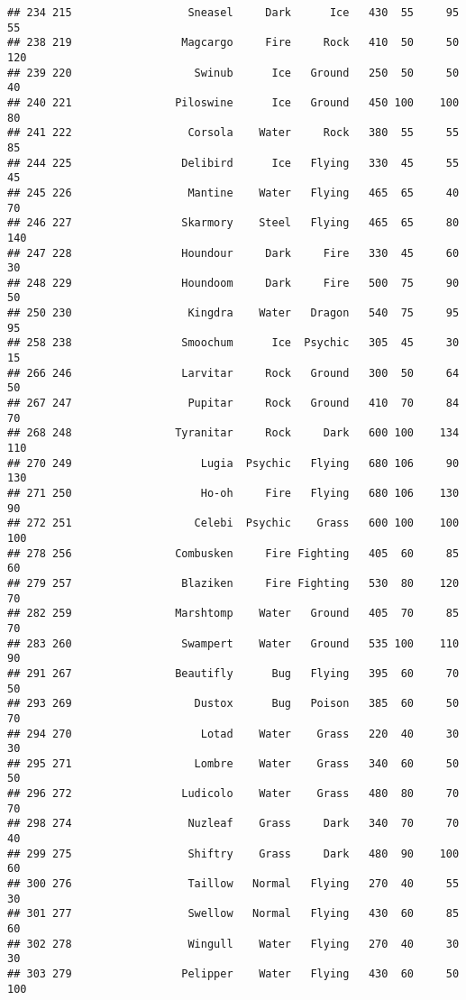 \documentclass[
]{article}
\begin{document}
\begin{verbatim}
## 234 215                  Sneasel     Dark      Ice   430  55     95      55
## 238 219                 Magcargo     Fire     Rock   410  50     50     120
## 239 220                   Swinub      Ice   Ground   250  50     50      40
## 240 221                Piloswine      Ice   Ground   450 100    100      80
## 241 222                  Corsola    Water     Rock   380  55     55      85
## 244 225                 Delibird      Ice   Flying   330  45     55      45
## 245 226                  Mantine    Water   Flying   465  65     40      70
## 246 227                 Skarmory    Steel   Flying   465  65     80     140
## 247 228                 Houndour     Dark     Fire   330  45     60      30
## 248 229                 Houndoom     Dark     Fire   500  75     90      50
## 250 230                  Kingdra    Water   Dragon   540  75     95      95
## 258 238                 Smoochum      Ice  Psychic   305  45     30      15
## 266 246                 Larvitar     Rock   Ground   300  50     64      50
## 267 247                  Pupitar     Rock   Ground   410  70     84      70
## 268 248                Tyranitar     Rock     Dark   600 100    134     110
## 270 249                    Lugia  Psychic   Flying   680 106     90     130
## 271 250                    Ho-oh     Fire   Flying   680 106    130      90
## 272 251                   Celebi  Psychic    Grass   600 100    100     100
## 278 256                Combusken     Fire Fighting   405  60     85      60
## 279 257                 Blaziken     Fire Fighting   530  80    120      70
## 282 259                Marshtomp    Water   Ground   405  70     85      70
## 283 260                 Swampert    Water   Ground   535 100    110      90
## 291 267                Beautifly      Bug   Flying   395  60     70      50
## 293 269                   Dustox      Bug   Poison   385  60     50      70
## 294 270                    Lotad    Water    Grass   220  40     30      30
## 295 271                   Lombre    Water    Grass   340  60     50      50
## 296 272                 Ludicolo    Water    Grass   480  80     70      70
## 298 274                  Nuzleaf    Grass     Dark   340  70     70      40
## 299 275                  Shiftry    Grass     Dark   480  90    100      60
## 300 276                  Taillow   Normal   Flying   270  40     55      30
## 301 277                  Swellow   Normal   Flying   430  60     85      60
## 302 278                  Wingull    Water   Flying   270  40     30      30
## 303 279                 Pelipper    Water   Flying   430  60     50     100

\end{verbatim}
\end{document}
